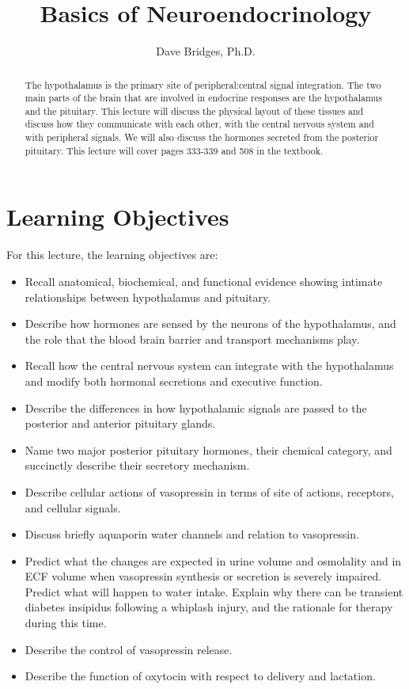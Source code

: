 \documentclass{tufte-handout}
\title{Basics of Neuroendocrinology}
\author{Dave Bridges, Ph.D.}
\begin{document}
\maketitle%

\begin{abstract}
\noindent The hypothalamus is the primary site of peripheral:central signal integration.  The two main parts of the brain that are involved in endocrine responses are the hypothalamus and the pituitary.  This lecture will discuss the physical layout of these tissues and discuss how they communicate with each other, with the central nervous system and with peripheral signals.  We will also discuss the hormones secreted from the posterior pituitary.  This lecture will cover pages 333-339 and 508 in the textbook\cite{Widmaier2013}.
\end{abstract}

\tableofcontents

\pagebreak

\section{Learning Objectives}
For this lecture, the learning objectives are:
\begin{itemize}
\item Recall anatomical, biochemical, and functional evidence showing intimate relationships between hypothalamus and pituitary.
\item Describe how hormones are sensed by the neurons of the hypothalamus, and the role that the blood brain barrier and transport mechanisms play.
\item Recall how the central nervous system can integrate with the hypothalamus and modify both hormonal secretions and executive function.
\item Describe the differences in how hypothalamic signals are passed to the posterior and anterior pituitary glands.
\item Name two major posterior pituitary hormones, their chemical category, and succinctly describe their secretory mechanism.
\item Describe cellular actions of vasopressin in terms of site of actions, receptors, and cellular signals.
\item Discuss briefly aquaporin water channels and relation to vasopressin. 
\item Predict what the changes are expected in urine volume and osmolality and in ECF volume when vasopressin synthesis or secretion is severely impaired. Predict what will happen to water intake. Explain why there can be transient diabetes insipidus following a whiplash injury, and the rationale for therapy during this time. 
\item Describe the control of vasopressin release.
\item Describe the function of oxytocin with respect to delivery and lactation.


\end{itemize}
\end{document}
